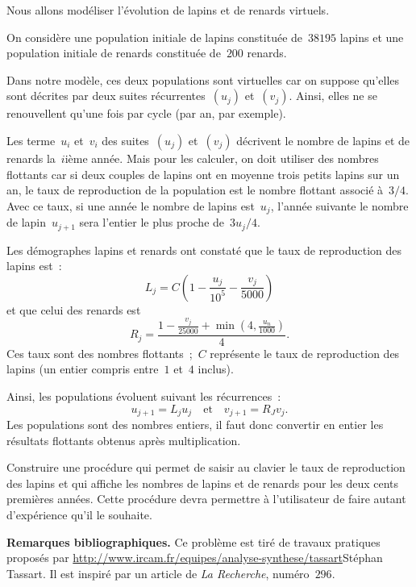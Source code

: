 \begin{exercice}
  Nous allons mod\'eliser  l'\'evolution   de  lapins et  de   renards
  virtuels.
  \par
  On  consid\`ere une population  initiale  de  lapins  constitu\'ee
  de~$38195$ lapins et une population initiale de renards constitu\'ee
  de~$200$ renards.
  \par
  Dans notre  mod\`ele,  ces deux populations  sont virtuelles  car on
  suppose     qu'elles     sont    d\'ecrites    par     deux   suites
  r\'ecurrentes~$(u_{j})$   et~$(v_{j})$.     Ainsi,    elles  ne   se
  renouvellent qu'une fois par cycle (par an, par exemple).
  \par
  Les    terme~$u_{i}$  et~$v_{i}$  des  suites~$(u_{j})$ et~$(v_{j})$
  d\'ecrivent le nombre de lapins et de  renards la~$i$i\`eme ann\'ee. 
  Mais pour les  calculer, on doit  utiliser des nombres flottants car
  si deux couples de lapins ont en moyenne  trois petits lapins sur un
  an, le taux de reproduction de  la population est le nombre flottant
  associ\'e  \`a~$3/4$. Avec  ce taux,   si  une ann\'ee le  nombre de
  lapins est~$u_{j}$, l'ann\'ee suivante  le nombre de lapin~$u_{j+1}$
  sera l'entier le plus proche de~${3u_{j}/4}$.
  \par
  Les d\'emographes  lapins et renards ont  constat\'e que  le taux de
  reproduction des lapins est~:
  $$
  L_{j}=C(1-\frac{u_{j}}{10^{5}}  -\frac{v_{j}}{5000})
  $$
  et que celui des renards est
  $$
  R_{j}=\frac{1-\frac{v_{j}}{25000} + \min(4,\frac{u_{n}}{1000})}{4}.
  $$
  Ces taux sont des nombres flottants~;~$C$ repr\'esente le taux de
  reproduction des lapins (un entier compris entre~$1$ et~$4$ inclus).
  \par
  Ainsi, les populations \'evoluent suivant les r\'ecurrences~:
  $$
  u_{j+1} = L_{j}u_{j}\quad 
  \mathrm{et}\quad   v_{j+1}   =  R_{J}v_{j}.
  $$
  Les populations sont des nombres entiers,  il faut donc convertir
  en entier les r\'esultats flottants obtenus apr\`es multiplication.
  \par
  Construire  une proc\'edure qui permet  de saisir au clavier le taux
  de reproduction des  lapins et qui affiche  les nombres de lapins et
  de   renards pour les     deux  cents premi\`eres ann\'ees.    Cette
  proc\'edure devra   permettre   \`a l'utilisateur   de faire  autant
  d'exp\'erience qu'il le souhaite.
  \ifcorrection\begin{correction}
  
  \end{correction}
\fi
\par
\textbf{Remarques bibliographiques.} %
Ce   probl\`eme   est  tir\'e  de  travaux   pratiques  propos\'es par
\url{http://www.ircam.fr/equipes/analyse-synthese/tassart}{St\'ephan
  Tassart}. Il est inspir\'e par un  article de \textit{La Recherche},
num\'ero~$296$.
\end{exercice}
